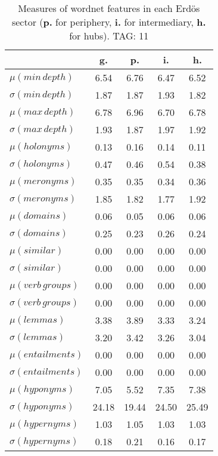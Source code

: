 \begin{table}[h!]
\begin{center}
\begin{tabular}{| l || c | c | c | c |}\hline
 & {\bf g.} & {\bf p.} & {\bf i.} & {\bf h.} \\\hline\hline
$\mu(min\,depth)$ & 6.54  & 6.76  & 6.47  & 6.52 \\
$\sigma(min\,depth)$ & 1.87  & 1.87  & 1.93  & 1.82 \\\hline
$\mu(max\,depth)$ & 6.78  & 6.96  & 6.70  & 6.78 \\
$\sigma(max\,depth)$ & 1.93  & 1.87  & 1.97  & 1.92 \\\hline
$\mu(holonyms)$ & 0.13  & 0.16  & 0.14  & 0.11 \\
$\sigma(holonyms)$ & 0.47  & 0.46  & 0.54  & 0.38 \\\hline
$\mu(meronyms)$ & 0.35  & 0.35  & 0.34  & 0.36 \\
$\sigma(meronyms)$ & 1.85  & 1.82  & 1.77  & 1.92 \\\hline
$\mu(domains)$ & 0.06  & 0.05  & 0.06  & 0.06 \\
$\sigma(domains)$ & 0.25  & 0.23  & 0.26  & 0.24 \\\hline
$\mu(similar)$ & 0.00  & 0.00  & 0.00  & 0.00 \\
$\sigma(similar)$ & 0.00  & 0.00  & 0.00  & 0.00 \\\hline
$\mu(verb\,groups)$ & 0.00  & 0.00  & 0.00  & 0.00 \\
$\sigma(verb\,groups)$ & 0.00  & 0.00  & 0.00  & 0.00 \\\hline
$\mu(lemmas)$ & 3.38  & 3.89  & 3.33  & 3.24 \\
$\sigma(lemmas)$ & 3.20  & 3.42  & 3.26  & 3.04 \\\hline
$\mu(entailments)$ & 0.00  & 0.00  & 0.00  & 0.00 \\
$\sigma(entailments)$ & 0.00  & 0.00  & 0.00  & 0.00 \\\hline
$\mu(hyponyms)$ & 7.05  & 5.52  & 7.35  & 7.38 \\
$\sigma(hyponyms)$ & 24.18  & 19.44  & 24.50  & 25.49 \\\hline
$\mu(hypernyms)$ & 1.03  & 1.05  & 1.03  & 1.03 \\
$\sigma(hypernyms)$ & 0.18  & 0.21  & 0.16  & 0.17 \\\hline
\end{tabular}
\caption{Measures of wordnet features in each Erd\"os sector ({{\bf p.}} for periphery, {{\bf i.}} for intermediary, {{\bf h.}} for hubs). TAG: 11}
\end{center}
\end{table}